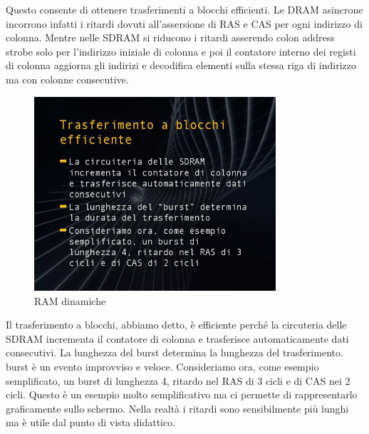 Questo consente di ottenere trasferimenti a blocchi efficienti.
Le DRAM asincrone incorrono infatti i ritardi dovuti all'assersione di RAS e CAS per ogni indirizzo di colonna.
Mentre nelle SDRAM si riducono i ritardi asserendo colon address strobe solo per l'indirizzo iniziale di colonna e poi il contatore interno dei registi di colonna aggiorna gli indirizi e decodifica elementi sulla stessa riga di indirizzo ma con colonne consecutive.

\FloatBarrier
\begin{figure}[H]
  \centering
  \includegraphics[width=0.80\textwidth,
                    trim=40 40 40 30, %
                    clip]
                    {images/Lez04_p06_fig_04.png}
  \caption{RAM dinamiche}
  \label{fig:Lez04_p06_fig_04}
\end{figure}
\FloatBarrier
\noindent

Il trasferimento a blocchi, abbiamo detto, è efficiente perché la circuteria delle SDRAM incrementa il contatore di colonna e trasferisce automaticamente dati consecutivi.
La lunghezza del burst determina la lunghezza del trasferimento.
burst è un evento improvviso e veloce.
Consideriamo ora, come esempio semplificato, un burst di lunghezza 4, ritardo nel RAS di 3 cicli e di CAS nei 2 cicli.
Questo è un esempio molto semplificativo ma ci permette di rappresentarlo graficamente sullo schermo.
Nella realtà i ritardi sono sensibilmente più lunghi ma è utile dal punto di vista didattico.


